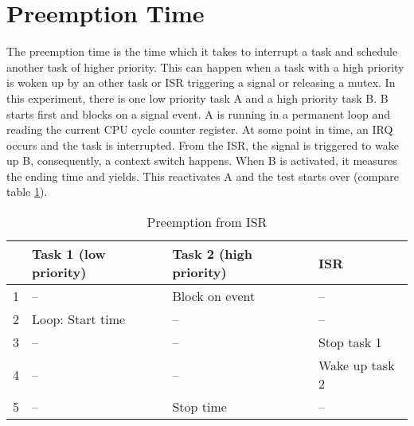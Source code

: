 \section{Preemption Time}
The preemption time is the time which it takes to interrupt a task and schedule another task of higher priority.
This can happen when a task with a high priority is woken up by an other task or \ac{ISR} triggering a signal or releasing a mutex.
In this experiment, there is one low priority task A and a high priority task B.
B starts first and blocks on a signal event.
A is running in a permanent loop and reading the current \ac{CPU} cycle counter register.
At some point in time, an \ac{IRQ} occurs and the task is interrupted.
From the \ac{ISR}, the signal is triggered to wake up B, consequently, a context switch happens.
When B is activated, it measures the ending time and yields.
This reactivates A and the test starts over (compare table \ref{tab_preemption}).

\begin{table}[htbp]
	\centering
		\begin{tabular}{|l|l|l|l|}
			\hline
				& Task 1 (low priority)& Task 2 (high priority)	& \ac{ISR}				\\
				\hline 
				1 & --									 & Block on event					& --							\\
			  2 & Loop: Start time		 & --											& --							\\
			  3 & --									 & --											& Stop task 1			\\
			  4 & --									 & --							 				& Wake up task 2	\\
			  5 & --									 & Stop time							& --							\\	  
			\hline
		\end{tabular}
	\caption{Preemption from ISR}
	\label{tab_preemption}
\end{table}

